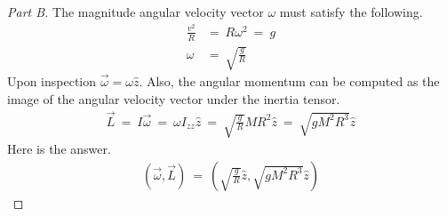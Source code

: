 \documentclass{article}
\numberwithin{equation}{section}
\begin{document}
\begin{proof}[Part B] 
    The magnitude angular velocity vector $\omega$ must satisfy the 
    following. 
    \begin{align}
        \frac {v^2} R & = \ R \omega^2 \ = \ g \\ 
        \omega & = \ \sqrt{\frac g R}
    \end{align}
    Upon inspection $\vec \omega = \omega \hat z$. Also, 
    the angular momentum can be computed as the image of the angular 
    velocity vector under the inertia tensor. 
    \begin{align}
        \vec L \ = \ I \vec \omega \ = \ \omega I_{zz} \hat z \ = \ 
        \sqrt{\frac g R} MR^2 \hat z \ = \ 
        \sqrt{gM^2 R^3}\hat z
    \end{align}
    Here is the answer. 
    \begin{align}
        \boxed{
        (\vec \omega, \vec L) \ = \ 
        \left(
            \sqrt{
                \frac g R
            }\hat z , 
            \sqrt{g M^2 R^3} \hat z
        \right)
        }
    \end{align}
\end{proof}
\end{document}
